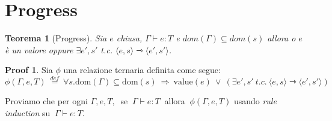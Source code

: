 \documentclass[a4paper, 10pt]{article}
\newtheorem{thm}{Teorema}[]
\theoremstyle{definition}
\newtheorem{prf}{Proof}[]
\newcommand{\srule}[2]{\langle #1 \rangle \rightarrowtriangle \langle #2 \rangle}
\begin{document}
\section*{Progress}


\begin{thm}[Progress]
	Sia $ e $ chiusa, $ \Gamma \vdash e\colon T$ e $ dom(\Gamma) \subseteq dom(s) $ allora o $ e $ è un valore oppure $ \exists e',s'$ t.c. $ \srule{e, s}{e', s'} $.
\end{thm}
\begin{prf}
	Sia $ \phi $ una relazione ternaria definita come segue:
$
		\phi(\Gamma, e, T)\ \stackrel{def}{=} \ \forall s. \text{dom}(\Gamma) \subseteq \text{dom}(s)\ \Rightarrow\ \text{value}(e)\ \vee\ (\exists e', s'\ t.c.\ \srule{e, s}{e', s'})
$

 	Proviamo che per ogni $ \Gamma, e, T,\ $ se $\ \Gamma \vdash e\colon T\ $ allora $\ \phi (\Gamma, e, T) $ usando \textit{rule induction} su $\ \Gamma \vdash e\colon T $.
\end{prf}
\end{document}
